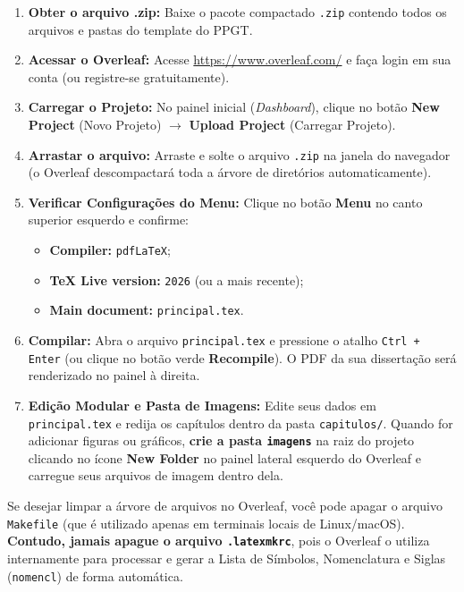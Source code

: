 \documentclass[12pt, a4paper]{article}
\begin{document}
\begin{enumerate}
    \item \textbf{Obter o arquivo .zip:} Baixe o pacote compactado \texttt{.zip} contendo todos os arquivos e pastas do template do PPGT.
    \item \textbf{Acessar o Overleaf:} Acesse \url{https://www.overleaf.com/} e faça login em sua conta (ou registre-se gratuitamente).
    \item \textbf{Carregar o Projeto:} No painel inicial (\textit{Dashboard}), clique no botão \textbf{New Project} (Novo Projeto) $\rightarrow$ \textbf{Upload Project} (Carregar Projeto).
    \item \textbf{Arrastar o arquivo:} Arraste e solte o arquivo \texttt{.zip} na janela do navegador (o Overleaf descompactará toda a árvore de diretórios automaticamente).
    \item \textbf{Verificar Configurações do Menu:} Clique no botão \textbf{Menu} no canto superior esquerdo e confirme:
    \begin{itemize}
        \item \textbf{Compiler:} \texttt{pdfLaTeX};
        \item \textbf{TeX Live version:} \texttt{2026} (ou a mais recente);
        \item \textbf{Main document:} \texttt{principal.tex}.
    \end{itemize}
    \item \textbf{Compilar:} Abra o arquivo \texttt{principal.tex} e pressione o atalho \texttt{Ctrl + Enter} (ou clique no botão verde \textbf{Recompile}). O PDF da sua dissertação será renderizado no painel à direita.
    \item \textbf{Edição Modular e Pasta de Imagens:} Edite seus dados em \texttt{principal.tex} e redija os capítulos dentro da pasta \texttt{capitulos/}. Quando for adicionar figuras ou gráficos, \textbf{crie a pasta \texttt{imagens}} na raiz do projeto clicando no ícone \textbf{New Folder} no painel lateral esquerdo do Overleaf e carregue seus arquivos de imagem dentro dela.
\end{enumerate}

\begin{atencao}
Se desejar limpar a árvore de arquivos no Overleaf, você pode apagar o arquivo \texttt{Makefile} (que é utilizado apenas em terminais locais de Linux/macOS). \textbf{Contudo, jamais apague o arquivo \texttt{.latexmkrc}}, pois o Overleaf o utiliza internamente para processar e gerar a Lista de Símbolos, Nomenclatura e Siglas (\texttt{nomencl}) de forma automática.
\end{atencao}
\end{document}
